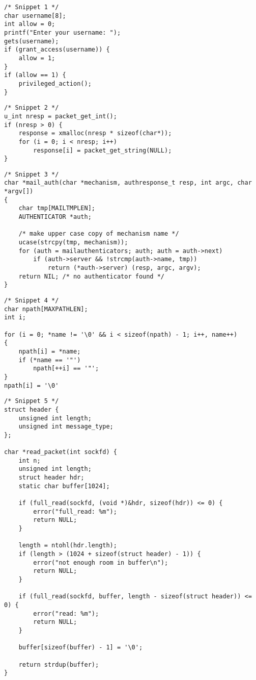 \documentclass[12pt,a4paper]{article}
\begin{document}
\begin{lstlisting}
/* Snippet 1 */
char username[8];
int allow = 0;
printf("Enter your username: ");
gets(username);
if (grant_access(username)) {
    allow = 1;
}
if (allow == 1) {
    privileged_action();
}
\end{lstlisting}

\begin{lstlisting}
/* Snippet 2 */
u_int nresp = packet_get_int();
if (nresp > 0) {
	response = xmalloc(nresp * sizeof(char*));
	for (i = 0; i < nresp; i++)
		response[i] = packet_get_string(NULL);
}
\end{lstlisting}

\newpage

\begin{lstlisting}
/* Snippet 3 */
char *mail_auth(char *mechanism, authresponse_t resp, int argc, char *argv[])
{
	char tmp[MAILTMPLEN];
	AUTHENTICATOR *auth;
	
	/* make upper case copy of mechanism name */
	ucase(strcpy(tmp, mechanism));
	for (auth = mailauthenticators; auth; auth = auth->next)
		if (auth->server && !strcmp(auth->name, tmp))
			return (*auth->server) (resp, argc, argv);
	return NIL; /* no authenticator found */
}
\end{lstlisting}

\begin{lstlisting}
/* Snippet 4 */
char npath[MAXPATHLEN];
int i;

for (i = 0; *name != '\0' && i < sizeof(npath) - 1; i++, name++)
{
	npath[i] = *name;
	if (*name == '"')
		npath[++i] == '"';
}
npath[i] = '\0'
\end{lstlisting}

\newpage

\begin{lstlisting}
/* Snippet 5 */
struct header {
	unsigned int length;
	unsigned int message_type;
};

char *read_packet(int sockfd) {
	int n;
	unsigned int length;
	struct header hdr;
	static char buffer[1024];

	if (full_read(sockfd, (void *)&hdr, sizeof(hdr)) <= 0) {
		error("full_read: %m");
		return NULL;
	}
	
	length = ntohl(hdr.length);
	if (length > (1024 + sizeof(struct header) - 1)) {
		error("not enough room in buffer\n");
		return NULL;
	}
	
	if (full_read(sockfd, buffer, length - sizeof(struct header)) <= 0) {
		error("read: %m");
		return NULL;
	}

	buffer[sizeof(buffer) - 1] = '\0';

	return strdup(buffer);
}
\end{lstlisting}
\end{document}
